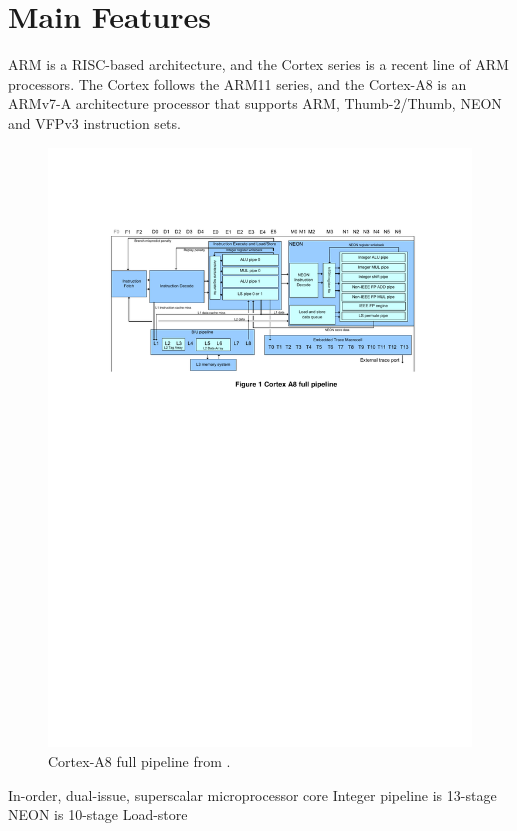 \documentclass[oneside,a4paper]{report}
\begin{document}
\chapter{Main Features}

ARM is a RISC-based architecture, and the Cortex series is a recent line of ARM processors. The Cortex follows the ARM11 series, and the Cortex-A8 is an ARMv7-A architecture processor that supports ARM, Thumb-2/Thumb, NEON and VFPv3 instruction sets.

\begin{figure}[htbp]
	\centering
	\includegraphics{./fig/Pipeline.pdf}
	\caption{Cortex-A8 full pipeline from \cite[p. 3]{Williamson}.}
	\label{fig:pipeline}
\end{figure}

In-order, dual-issue, superscalar microprocessor core
Integer pipeline is 13-stage
NEON is 10-stage
Load-store
\end{document}
